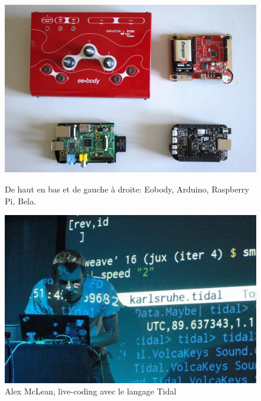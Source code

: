 \begin{figure}[!htbp]
	\captionsetup{format=plain}%
	\centering
	\begin{minipage}[t]{0.48\textwidth}
		\includegraphics[width=\linewidth]{gfx/02_ephemeral/Eobody-arduino-raspi-bela_144px.jpg}
		\caption[Eobody, Arduino, Raspberry Pi, Bela]{De haut en bas et de gauche à droite: Eobody, Arduino, Raspberry Pi, Bela.}
		\label{fig:ephemeral:DIY-devices}
	\end{minipage}
	\hspace{.02\linewidth}
	\begin{minipage}[t]{0.48\textwidth}
	  \includegraphics[width=\linewidth]{gfx/02_ephemeral/alex_mclean_144px.jpg}
		\caption[Alex McLean, live-coding avec le langage Tidal]{Alex McLean, live-coding avec le langage Tidal}
		\label{fig:ephemeral:livecoding}
	\end{minipage}
\end{figure}



